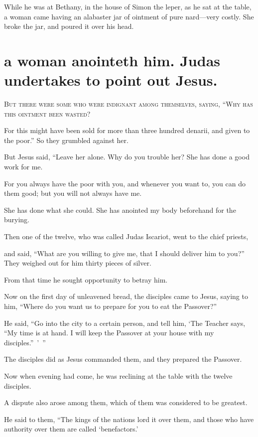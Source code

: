 While he was at Bethany, in the house of Simon the leper, as he sat at the table, a woman came having an alabaster jar of ointment of pure nard—very costly. She broke the jar, and poured it over his head.


\clearpage \section*{a woman anointeth him. Judas undertakes to point out Jesus.}

\lettrine{B}{ut there were some who were indignant among themselves, saying, “Why has this ointment been wasted?}

For this might have been sold for more than three hundred denarii,  and given to the poor.” So they grumbled against her.

But Jesus said, “Leave her alone. Why do you trouble her? She has done a good work for me.

For you always have the poor with you, and whenever you want to, you can do them good; but you will not always have me.

She has done what she could. She has anointed my body beforehand for the burying.

Then one of the twelve, who was called Judas Iscariot, went to the chief priests,

and said, “What are you willing to give me, that I should deliver him to you?” They weighed out for him thirty pieces of silver.

From that time he sought opportunity to betray him.

Now on the first day of unleavened bread, the disciples came to Jesus, saying to him, “Where do you want us to prepare for you to eat the Passover?”

He said, “Go into the city to a certain person, and tell him, ‘The Teacher says, “My time is at hand. I will keep the Passover at your house with my disciples.” ’ ”

The disciples did as Jesus commanded them, and they prepared the Passover.

Now when evening had come, he was reclining at the table with the twelve disciples.

A dispute also arose among them, which of them was considered to be greatest.

He said to them, “The kings of the nations lord it over them, and those who have authority over them are called ‘benefactors.’




